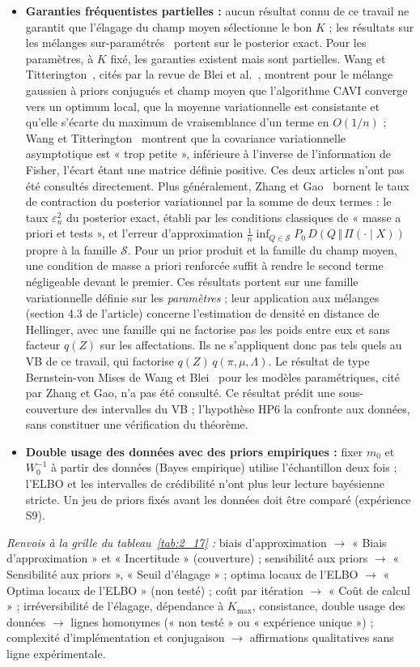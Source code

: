 \begin{itemize}
\item \textbf{Garanties fréquentistes partielles : }aucun résultat connu de ce travail ne garantit que l'élagage du champ moyen sélectionne le bon $K$ ; les résultats sur les mélanges sur-paramétrés~\cite{rousseau2011} portent sur le posterior exact. Pour les paramètres, à $K$ fixé, les garanties existent mais sont partielles. Wang et Titterington~\cite{wang2006}, cités par la revue de Blei et al.~\cite[section~5.2]{blei2017}, montrent pour le mélange gaussien à priors conjugués et champ moyen que l'algorithme CAVI converge vers un optimum local, que la moyenne variationnelle est consistante et qu'elle s'écarte du maximum de vraisemblance d'un terme en $O(1/n)$ ; Wang et Titterington~\cite{wang2005} montrent que la covariance variationnelle asymptotique est « trop petite », inférieure à l'inverse de l'information de Fisher, l'écart étant une matrice définie positive. Ces deux articles n'ont pas été consultés directement. Plus généralement, Zhang et Gao~\cite{zhang2020} bornent le taux de contraction du posterior variationnel par la somme de deux termes : le taux $\varepsilon_n^2$ du posterior exact, établi par les conditions classiques de « masse a priori et tests », et l'erreur d'approximation $\frac{1}{n}\inf_{Q \in \mathcal{S}} P_0\,D(Q \,\Vert\, \Pi(\cdot \mid X))$ propre à la famille $\mathcal{S}$. Pour un prior produit et la famille du champ moyen, une condition de masse a priori renforcée suffit à rendre le second terme négligeable devant le premier. Ces résultats portent sur une famille variationnelle définie sur les \emph{paramètres} ; leur application aux mélanges (section 4.3 de l'article) concerne l'estimation de densité en distance de Hellinger, avec une famille qui ne factorise pas les poids entre eux et sans facteur $q(Z)$ sur les affectations. Ils ne s'appliquent donc pas tels quels au VB de ce travail, qui factorise $q(Z)\,q(\pi, \mu, \Lambda)$. Le résultat de type Bernstein-von Mises de Wang et Blei~\cite{wang2019} pour les modèles paramétriques, cité par Zhang et Gao, n'a pas été consulté. Ce résultat prédit une sous-couverture des intervalles du VB ; l'hypothèse HP6 la confronte aux données, sans constituer une vérification du théorème.
\item \textbf{Double usage des données avec des priors empiriques : }fixer $m_0$ et $W_0^{-1}$ à partir des données (Bayes empirique) utilise l'échantillon deux fois ; l'ELBO et les intervalles de crédibilité n'ont plus leur lecture bayésienne stricte. Un jeu de priors fixés avant les données doit être comparé (expérience S9).
\end{itemize}
\par\noindent\emph{Renvois à la grille du tableau~\ref{tab:2_17} :} biais d'approximation $\to$ « Biais d'approximation » et « Incertitude » (couverture) ; sensibilité aux priors $\to$ « Sensibilité aux priors », « Seuil d'élagage » ; optima locaux de l'ELBO $\to$ « Optima locaux de l'ELBO » (non testé) ; coût par itération $\to$ « Coût de calcul » ; irréversibilité de l'élagage, dépendance à $K_{\max}$, consistance, double usage des données $\to$ lignes homonymes (« non testé » ou « expérience unique ») ; complexité d'implémentation et conjugaison $\to$ affirmations qualitatives sans ligne expérimentale.
